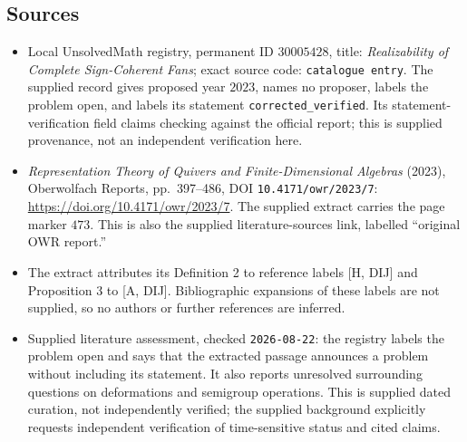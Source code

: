 \documentclass[11pt]{article}
\begin{document}
\subsection{Sources}
\begin{itemize}
\item Local UnsolvedMath registry, permanent ID \(30005428\), title: \emph{Realizability of Complete Sign-Coherent Fans}; exact source code: \texttt{catalogue entry}. The supplied record gives proposed year \(2023\), names no proposer, labels the problem open, and labels its statement \texttt{corrected\_verified}. Its statement-verification field claims checking against the official report; this is supplied provenance, not an independent verification here.
\item \emph{Representation Theory of Quivers and Finite-Dimensional Algebras} (2023), Oberwolfach Reports, pp.\ 397--486, DOI \texttt{10.4171/owr/2023/7}: \url{https://doi.org/10.4171/owr/2023/7}. The supplied extract carries the page marker \(473\). This is also the supplied literature-sources link, labelled ``original OWR report.''
\item The extract attributes its Definition 2 to reference labels [H, DIJ] and Proposition 3 to [A, DIJ]. Bibliographic expansions of these labels are not supplied, so no authors or further references are inferred.
\item Supplied literature assessment, checked \texttt{2026-08-22}: the registry labels the problem open and says that the extracted passage announces a problem without including its statement. It also reports unresolved surrounding questions on deformations and semigroup operations. This is supplied dated curation, not independently verified; the supplied background explicitly requests independent verification of time-sensitive status and cited claims.
\end{itemize}
\end{document}
